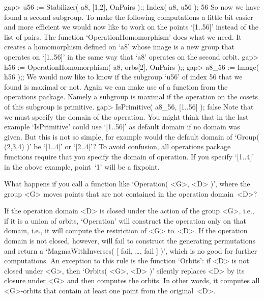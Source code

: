     gap> u56 := Stabilizer( a8, [1,2], OnPairs );; Index( a8, u56 );
    56 
\endexample
So   now   we have  found   a  second subgroup.   To   make the following
computations a little bit easier and more efficient  we would now like to
work on the points `[1..56]'  instead of the list  of pairs. The function
`OperationHomomorphism' does what  we need.   It creates a   homomorphism
defined on `a8' whose image is a new group  that operates on `[1..56]' in
the same way that `a8' operates on the second orbit.
\beginexample
    gap> h56 := OperationHomomorphism( a8, orbs[2], OnPairs );;
    gap> a8_56 := Image( h56 );;
\endexample
We would now like to know if the subgroup `u56' of index 56 that we found
is  maximal or  not.   Again  we can make  use  of  a function  from  the
operations package.  Namely a subgroup is maximal if the operation on the
cosets of  this subgroup is primitive.
\beginexample
    gap> IsPrimitive( a8_56, [1..56] );
    false 
\endexample
Note that we  must specify the domain  of the operation. You might  think
that  in the last example   `IsPrimitive' could use `[1..56]' as  default
domain  if no domain was given.  But this is   not so simple, for example
would the  default domain of `Group(  (2,3,4) )' be `[1..4]' or `[2..4]'?
To  avoid confusion,  all  operations package  functions require that you
specify the  domain of operation. If  you  specify `[1..4]' in  the above
example, point~`1' will be a fixpoint.

\exercise What happens if  you call a function  like `Operation( <G>, <D>
)',  where the group  <G>  moves points  that are   not contained in  the
operation domain~<D>?

\answer If the  operation domain <D> is  closed  under the action  of the
group <G>, i.e., if  it is a union of  orbits, `Operation' will construct
the operation only on that domain, i.e.,  it will compute the restriction
of <G> to~<D>. If  the operation domain  is  not closed, however,  {\GAP}
will   fail to construct  the     generating permutations and return    a
`MagmaWithInverses( [ fail,  \dots,  fail  ] )',  which  is no  good  for
further computations. An exception to this rule is the function `Orbits':
if  <D> is not   closed under <G>, then    `Orbits( <G>, <D> )'  silently
replaces  <D> by its  closure under <G>  and then computes the orbits. In
other words, it  computes all <G>-orbits that contain  at least one point
from the original~<D>.

